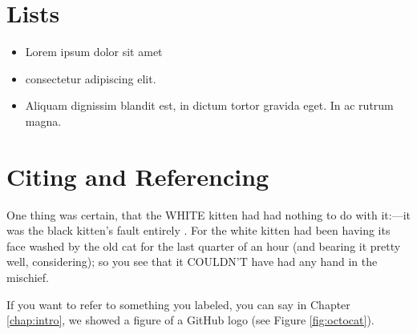 \section{Lists}
\begin{itemize}
\item Lorem ipsum dolor sit amet
\item consectetur adipiscing elit. 
\item Aliquam dignissim blandit est, in dictum tortor gravida eget. In ac rutrum magna.
\end{itemize}

\section{Citing and Referencing}
  One thing was certain, that the WHITE kitten had had nothing to
do with it:---it was the black kitten's fault entirely \cite{aiw}.  For the
white kitten had been having its face washed by the old cat for
the last quarter of an hour (and bearing it pretty well,
considering); so you see that it COULDN'T have had any hand in
the mischief.

If you want to refer to something you labeled, you can say in Chapter \ref{chap:intro}, we showed a figure of a GitHub logo (see Figure \ref{fig:octocat}).